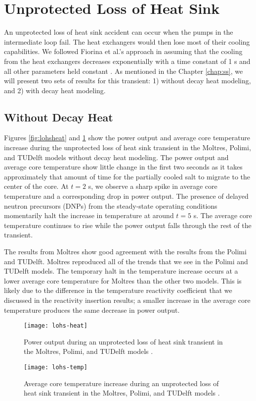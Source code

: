\clearpage

\section{Unprotected Loss of Heat Sink}

An unprotected loss of heat sink accident can occur when the pumps in the
intermediate loop fail. The heat exchangers would then lose most of their
cooling capabilities. We followed Fiorina et al.'s approach in assuming that
the cooling from the heat exchangers decreases exponentially with a time
constant of 1 s and all other parameters held constant
\cite{fiorina_modelling_2014}. As mentioned in the Chapter \ref{chap:ss}, we
will present two sets of results for this transient: 1) without decay heat modeling, and 2) with decay heat modeling.

\subsection{Without Decay Heat}

Figures \ref{fig:lohsheat} and \ref{fig:lohstemp} show the power output and
average core temperature increase during the unprotected loss of heat sink
transient in the Moltres, Polimi, and TUDelft models without decay heat
modeling. The power output and average core temperature show little change in
the first two seconds as it takes approximately that amount of time for the
partially cooled salt to migrate to the center of the core. At $t=2$ s, we
observe a sharp spike in average core temperature and a corresponding drop
in power output. The presence of delayed neutron precursors (DNPs) from the
steady-state operating conditions momentarily halt the increase in temperature
at around $t=5$ s. The average core temperature continues to rise while the
power output falls through the rest of the transient.

The results from Moltres show good agreement with the results from the Polimi
and TUDelft. Moltres reproduced all of the trends that we see in the Polimi
and TUDelft models. The temporary halt in the temperature increase occurs at
a lower average core temperature for Moltres than the other two models. This
is likely due to the difference in the temperature reactivity coefficient
that we discussed in the reactivity insertion results; a smaller increase in
the average core temperature produces the same decrease in power output.

\begin{figure}[htbp!]
    \centering
    \texttt{[image: lohs-heat]}
    \caption{Power output during
    an unprotected loss of heat sink transient in the Moltres, Polimi, and
    TUDelft models \cite{fiorina_modelling_2014}.}
    \label{fig:lohsheat}
    \texttt{[image: lohs-temp]}
    \caption{Average core temperature increase during
    an unprotected loss of heat sink transient in the Moltres, Polimi, and
    TUDelft models \cite{fiorina_modelling_2014}.}
    \label{fig:lohstemp}
\end{figure}

